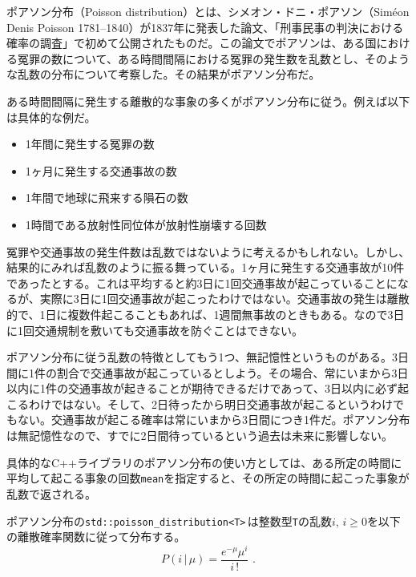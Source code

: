 
ポアソン分布（Poisson distribution）とは、シメオン・ドニ・ポアソン（Sim\'eon Denis Poisson 1781--1840）が1837年に発表した論文、「刑事民事の判決における確率の調査」で初めて公開されたものだ。この論文でポアソンは、ある国における冤罪の数について、ある時間間隔における冤罪の発生数を乱数とし、そのような乱数の分布について考察した。その結果がポアソン分布だ。

ある時間間隔に発生する離散的な事象の多くがポアソン分布に従う。例えば以下は具体的な例だ。

\begin{itemize}
\item
  1年間に発生する冤罪の数
\item
  1ヶ月に発生する交通事故の数
\item
  1年間で地球に飛来する隕石の数
\item
  1時間である放射性同位体が放射性崩壊する回数
\end{itemize}

冤罪や交通事故の発生件数は乱数ではないように考えるかもしれない。しかし、結果的にみれば乱数のように振る舞っている。1ヶ月に発生する交通事故が10件であったとする。これは平均すると約3日に1回交通事故が起こっていることになるが、実際に3日に1回交通事故が起こったわけではない。交通事故の発生は離散的で、1日に複数件起こることもあれば、1週間無事故のときもある。なので3日に1回交通規制を敷いても交通事故を防ぐことはできない。

ポアソン分布に従う乱数の特徴としてもう1つ、無記憶性というものがある。3日間に1件の割合で交通事故が起こっているとしよう。その場合、常にいまから3日以内に1件の交通事故が起きることが期待できるだけであって、3日以内に必ず起こるわけではない。そして、2日待ったから明日交通事故が起こるというわけでもない。交通事故が起こる確率は常にいまから3日間につき1件だ。ポアソン分布は無記憶性なので、すでに2日間待っているという過去は未来に影響しない。

具体的なC++ライブラリのポアソン分布の使い方としては、ある所定の時間に平均して起こる事象の回数\texttt{mean}を指定すると、その所定の時間に起こった事象が乱数で返される。


ポアソン分布の\texttt{std::poisson\_distribution<T>}\,は整数型\texttt{T}の乱数\(i\), \(i \geq 0\)を以下の離散確率関数に従って分布する。
\[
P(i\,|\,\mu) = \frac{e^{-\mu} \mu^{i}}{i\,!} \text{ .}
\]


